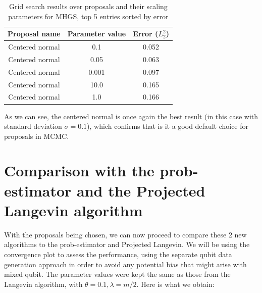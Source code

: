 \documentclass[12pt]{memoir}
\begin{document}
\begin{table}[H]

    \begin{center}

        \begin{tabular}{|c|c|c|}

            \hline

            Proposal name & Parameter value & Error ($L_2^2$)\\

            \hline\hline

            Centered normal& 0.1&0.052\\

            Centered normal& 0.05&0.063\\

            Centered normal& 0.001&0.097\\

            Centered normal& 10.0&0.165\\

            Centered normal& 1.0&0.166\\\hline

        \end{tabular}

\end{center}

\caption{Grid search results over proposals and their scaling parameters for MHGS, top 5 entries sorted by error}

\label{table:proposal-grid-search-mhgs}

\end{table}

As we can see, the centered normal is once again the best result (in this case with standard deviation $\sigma=0.1$), which confirms that is it a good default choice for proposals in MCMC.


\section{Comparison with the prob-estimator and the Projected Langevin algorithm}\label{section:mhs-mhgs-num-exp}

With the proposals being chosen, we can now proceed to compare these 2 new algorithms to the prob-estimator and Projected Langevin. We will be using the convergence plot to assess the performance, using the separate qubit data generation approach in order to avoid any potential bias that might arise with mixed qubit. The parameter values were kept the same as those from the Langevin algorithm, with $\theta=0.1,\lambda=m/2$. Here is what we obtain:\medbreak
\end{document}
